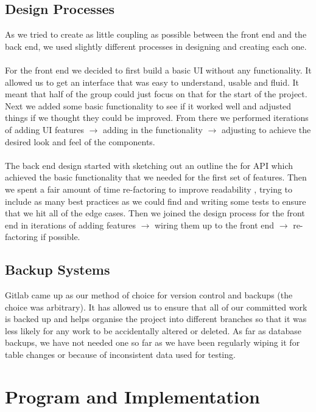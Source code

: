 \documentclass[10pt,a4paper]{article}
\begin{document}
\subsection{Design Processes}

As we tried to create as little coupling as possible between the front end and 
the back end, we used slightly different processes in designing and creating 
each one.  
\\
\\
\noindent For the front end we decided to first build a basic UI without any 
functionality. It allowed us to get an interface that was easy to understand, 
usable and fluid. It meant that half of the group could just focus on that for 
the start of the project. Next we added some basic functionality to see if it 
worked well and adjusted things if we thought they could be improved. From there 
we performed iterations of adding UI features $\rightarrow$ adding in the 
functionality $\rightarrow$ adjusting to achieve the desired look and feel of 
the components.
\\
\\
\noindent The back end design started with sketching out an outline the for API 
which achieved the basic functionality that we needed for the first set of 
features. Then we spent a fair amount of time re-factoring to improve 
readability , trying to include as many best practices as we could find and 
writing some tests to ensure that we hit all of the edge cases. Then we joined 
the design process for the front end in iterations of adding features 
$\rightarrow$ wiring them up to the front end $\rightarrow$ re-factoring if 
possible.     

\subsection{Backup Systems}

Gitlab came up as our method of choice for version control and backups (the 
choice was arbitrary). It has allowed us to ensure that all of our committed 
work is backed up and helps organise the project into different branches so that it was less 
likely for any work to be accidentally altered or deleted. As far as database backups, 
we have not needed one so far as we have been regularly wiping it for table 
changes or because of inconsistent data used for testing. 

\section{Program and Implementation}
\end{document}
